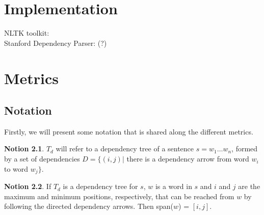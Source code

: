 \documentclass[a4paper, 11pt]{report}
\theoremstyle{definition}
\newtheorem{notion}{Notion}
\theoremstyle{plain}
\begin{document}
%
%

\appendix
\chapter{Implementation}
\label{appendix:impl}

NLTK toolkit: \cite{bird2009natural}\\
Stanford Dependency Parser: \cite{de2008stanford}(?)

%
%



%
%

\chapter{Metrics}
\label{appendix:metric}

\section{Notation}

Firstly, we will present some notation that is shared along the different metrics.

\begin{notion}
$T_d$ will refer to a dependency tree of a sentence $s = w_1 \dots w_n$, formed by a set of dependencies $D = \{ (i,j) |$ there is a dependency arrow from word $w_i$ to word $w_j \}$.
\end{notion}

\begin{notion}
If $T_d$ is a dependency tree for $s$, $w$ is a word in $s$ and $i$ and $j$ are the maximum and minimum positions, respectively, that can be reached from $w$ by following the directed dependency arrows. Then span($w$) = $[i,j]$.
\end{notion}
\end{document}
